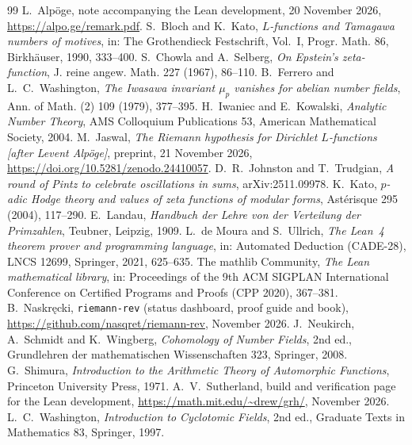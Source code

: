 \documentclass[11pt]{article}
\theoremstyle{plain}
\theoremstyle{definition}
\begin{document}
\begin{thebibliography}{99}
 L.~Alp\"oge, note accompanying the Lean development, 20 November 2026,
  \url{https://alpo.ge/remark.pdf}.
 S.~Bloch and K.~Kato, \emph{$L$-functions and Tamagawa numbers of motives}, in:
  The Grothendieck Festschrift, Vol.~I, Progr. Math. 86, Birkh\"auser, 1990, 333--400.
 S.~Chowla and A.~Selberg, \emph{On Epstein's zeta-function}, J. reine angew.
  Math. 227 (1967), 86--110.
 B.~Ferrero and L.~C.~Washington, \emph{The Iwasawa invariant $\mu_p$
  vanishes for abelian number fields}, Ann. of Math. (2) 109 (1979), 377--395.
 H.~Iwaniec and E.~Kowalski, \emph{Analytic Number Theory}, AMS Colloquium
  Publications 53, American Mathematical Society, 2004.
 M.~Jaswal, \emph{The Riemann hypothesis for Dirichlet $L$-functions [after Levent
  Alp\"oge]}, preprint, 21 November 2026, \url{https://doi.org/10.5281/zenodo.24410057}.
 D.~R.~Johnston and T.~Trudgian, \emph{A round of Pintz to celebrate
  oscillations in sums}, arXiv:2511.09978.
 K.~Kato, \emph{$p$-adic Hodge theory and values of zeta functions of modular forms},
  Ast\'erisque 295 (2004), 117--290.
 E.~Landau, \emph{Handbuch der Lehre von der Verteilung der Primzahlen}, Teubner,
  Leipzig, 1909.
 L.~de Moura and S.~Ullrich, \emph{The Lean~4 theorem prover and programming
  language}, in: Automated Deduction (CADE-28), LNCS 12699, Springer, 2021, 625--635.
 The mathlib Community, \emph{The Lean mathematical library}, in: Proceedings of the
  9th ACM SIGPLAN International Conference on Certified Programs and Proofs (CPP 2020), 367--381.
 B.~Naskr\k{e}cki, \texttt{riemann-rev} (status dashboard, proof guide and book),
  \url{https://github.com/nasqret/riemann-rev}, November 2026.
 J.~Neukirch, A.~Schmidt and K.~Wingberg, \emph{Cohomology of Number Fields}, 2nd ed.,
  Grundlehren der mathematischen Wissenschaften 323, Springer, 2008.
 G.~Shimura, \emph{Introduction to the Arithmetic Theory of Automorphic Functions},
  Princeton University Press, 1971.
 A.~V.~Sutherland, build and verification page for the Lean development,
  \url{https://math.mit.edu/~drew/grh/}, November 2026.
 L.~C.~Washington, \emph{Introduction to Cyclotomic Fields}, 2nd ed., Graduate
  Texts in Mathematics 83, Springer, 1997.
\end{thebibliography}
\end{document}
